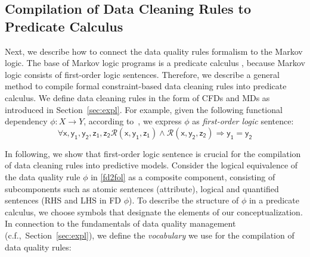 \subsection{Compilation of Data Cleaning Rules to Predicate Calculus}
\label{sec:ml} 

Next, we describe how to connect the data quality rules formalism to the Markov logic. The base of Markov logic programs is a predicate calculus \cite{genesereth1987logical}, because Markov logic consists of first-order logic sentences. Therefore, we describe a general method to compile formal constraint-based data cleaning rules into predicate calculus. We define data cleaning rules in the form of CFDs and MDs as introduced in Section~\ref{sec:expl}. For example, given the following functional dependency $\phi: X \rightarrow Y$, according to~\cite{Fagin:1982:HCD:322344.322347}, we express $\phi$ as \textit{first-order logic} sentence:
\begin{equation}
\mathsf{\forall x, y_1, y_2, z_1, z_2 \mathcal{R}(x, y_1, z_1) \wedge \mathcal{R}(x, y_2, z_2) \Rightarrow y_1=y_2}
\label{fd2fol}
\end{equation}

In following, we show that first-order logic sentence is crucial for the compilation of data cleaning rules into predictive models. %
Consider the logical equivalence of the data quality rule $\phi$ in \ref{fd2fol} as a composite component, consisting of subcomponents such as atomic sentences (attribute), logical and quantified sentences (RHS and LHS in FD $\phi$). To describe the structure of $\phi$ in a predicate calculus, we choose symbols that designate the elements of our conceptualization. In connection to the fundamentals of data quality management (c.f.,~Section~\ref{sec:expl}), we define the \textit{vocabulary} we use for the compilation of data quality rules: 

